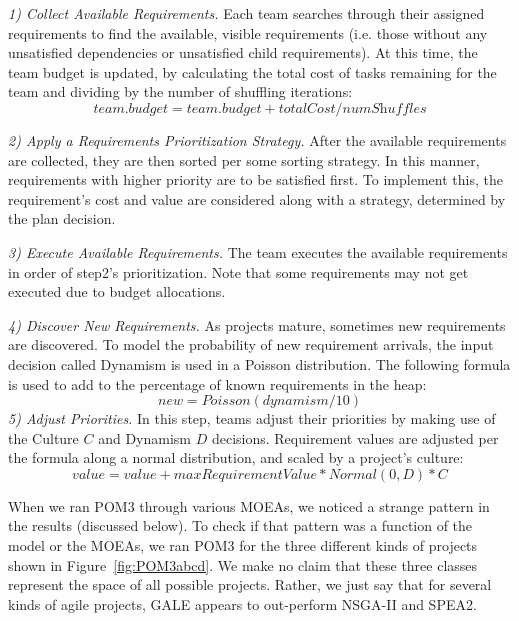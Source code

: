 \documentclass[10pt,journal,compsoc]{IEEEtran}
\newcommand{\fig}[1]{Figure~\ref{fig:#1}}
\begin{document}
    {\em 1) Collect Available Requirements.} Each team searches through
    their assigned requirements to find the available, visible
    requirements (i.e. those without any  unsatisfied dependencies
    or unsatisfied child requirements).  At this time, the team budget
    is updated, by calculating the total cost of tasks remaining for the
    team and dividing by the number of shuffling iterations:
    \[\textit{team.budget} = \textit{team.budget} + \textit{totalCost/numShuffles}\]
    
    {\em 2) Apply a Requirements Prioritization Strategy.}  After the
    available requirements are collected, they are then sorted per some
    sorting strategy. In this manner, requirements with higher priority
    are to be satisfied first. To implement this, the requirement's cost
    and value are considered along with a strategy, determined by the
    plan decision.
    
    {\em 3) Execute Available Requirements.} The team executes the
    available requirements in order of step2's prioritization.
    Note that some requirements may not get executed due to budget allocations.
    
    {\em 4) Discover New Requirements.} As projects mature, sometimes new requirements are discovered.  To model the probability of new requirement arrivals, the input decision called Dynamism is used in a Poisson distribution.  
    The following formula  is used to add to the percentage of known requirements in the heap:
    \begin{equation}\label{eq:dymn}
    \textit{new} = \textit{Poisson}\left(\textit{dynamism}/10\right)
    \end{equation}
    {\em 5) Adjust Priorities.} In this step, teams adjust their priorities by making use of the Culture $C$ and Dynamism 
    $D$ decisions.  Requirement values are adjusted per the formula along a normal distribution, and scaled by a project’s culture:
    \[
    \textit{value} = \textit{value} + \textit{maxRequirementValue}*\textit{Normal}(0, D)*C
    \]  

When we ran POM3 through various MOEAs, we noticed a strange pattern in the results
(discussed below). To check if that pattern was a function of the model or the MOEAs,
we ran POM3 for the three different kinds of projects shown in \fig{POM3abcd}.
We make no claim that these three classes represent the space of all possible projects.
Rather, we just say that for several kinds of agile projects,
GALE appears to out-perform NSGA-II and SPEA2.
\end{document}
